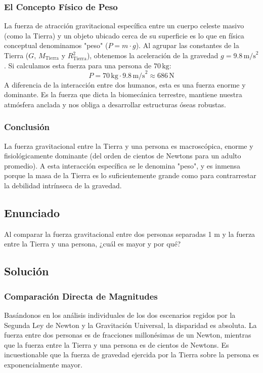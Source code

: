 \documentclass[12pt]{article}
\begin{document}
\subsubsection*{El Concepto Físico de Peso}
La fuerza de atracción gravitacional específica entre un cuerpo celeste masivo (como la Tierra) y un objeto ubicado cerca de su superficie es lo que en física conceptual denominamos "peso" ($P = m \cdot g$). Al agrupar las constantes de la Tierra ($G$, $M_{\text{Tierra}}$ y $R_{\text{Tierra}}^2$), obtenemos la aceleración de la gravedad $g = 9.8 \, \text{m/s}^2$. 
Si calculamos esta fuerza para una persona de $70 \, \text{kg}$:
\begin{equation}
    P = 70 \, \text{kg} \cdot 9.8 \, \text{m/s}^2 \approx 686 \, \text{N}
\end{equation}
A diferencia de la interacción entre dos humanos, esta es una fuerza enorme y dominante. Es la fuerza que dicta la biomecánica terrestre, mantiene nuestra atmósfera anclada y nos obliga a desarrollar estructuras óseas robustas.

\subsubsection*{Conclusión}
La fuerza gravitacional entre la Tierra y una persona es macroscópica, enorme y fisiológicamente dominante (del orden de cientos de Newtons para un adulto promedio). A esta interacción específica se le denomina "peso", y es inmensa porque la masa de la Tierra es lo suficientemente grande como para contrarrestar la debilidad intrínseca de la gravedad.

\newpage

\subsection*{Enunciado}
Al comparar la fuerza gravitacional entre dos personas separadas 1 m y la fuerza entre la Tierra y una persona, ¿cuál es mayor y por qué?

\subsection*{Solución}

\subsubsection*{Comparación Directa de Magnitudes}
Basándonos en los análisis individuales de los dos escenarios regidos por la Segunda Ley de Newton y la Gravitación Universal, la disparidad es absoluta. La fuerza entre dos personas es de fracciones millonésimas de un Newton, mientras que la fuerza entre la Tierra y una persona es de cientos de Newtons. Es incuestionable que la fuerza de gravedad ejercida por la Tierra sobre la persona es exponencialmente mayor.
\end{document}
